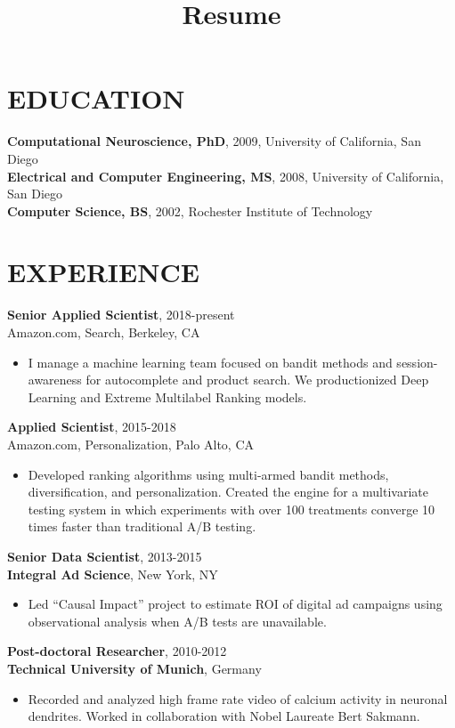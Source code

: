 \documentclass[line,10pt]{res}
\title{Resume}
\begin{document}
 
\thispagestyle{empty} %
\address{716.771.8224}
\address{daniel.n.hill@gmail.com}

\begin{resume}

\section{EDUCATION}
 \textbf{Computational Neuroscience, PhD}, 2009, University of California, San Diego \\
 \textbf{Electrical and Computer Engineering, MS}, 2008, University of California, San Diego \\
 \textbf{Computer Science, BS}, 2002, Rochester Institute of Technology
\section{EXPERIENCE}
 {\bf Senior Applied Scientist}, 2018-present \\ Amazon.com, Search, Berkeley, CA 
  \begin{itemize}
          \item[] I manage a machine learning team focused on bandit methods and session-awareness for autocomplete and product search.  We productionized Deep Learning and Extreme Multilabel Ranking models.
   \end{itemize}

 {\bf Applied Scientist}, 2015-2018 \\ Amazon.com, Personalization, Palo Alto, CA 
  \begin{itemize}
          \item[] Developed ranking algorithms using multi-armed bandit methods, diversification, and personalization. Created the engine for a multivariate testing system in which experiments with over 100 treatments converge 10 times faster than traditional A/B testing.  
   \end{itemize}
   
 {\bf Senior Data Scientist}, 2013-2015 \\ {\bf Integral Ad Science}, New York, NY 
  \begin{itemize}
          \item[] {\small Led ``Causal Impact'' project to estimate ROI of digital ad campaigns using observational analysis when A/B tests are unavailable.  }
        \end{itemize}
{\bf Post-doctoral Researcher}, 2010-2012 \\ {\bf Technical University of Munich}, Germany 
  \begin{itemize}
        \item[] {\small 
Recorded and analyzed high frame rate video of calcium activity in neuronal dendrites.  Worked in collaboration with Nobel Laureate Bert Sakmann.        }
  \end{itemize}


\end{resume}
\end{document}
